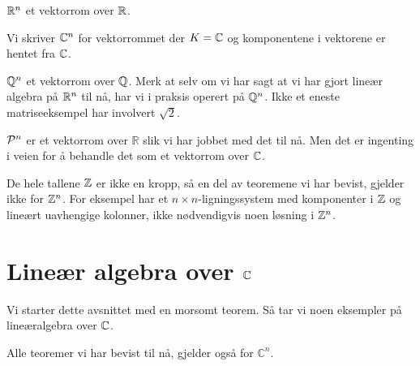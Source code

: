 \begin{ex}
$\R^n$ et vektorrom over $\R$.
\end{ex}

\begin{ex}
Vi skriver $\C^n$ for vektorrommet der $K=\C$ og komponentene i vektorene er hentet fra $\C$.
\end{ex}

\begin{ex}
$\Q^n$ et vektorrom over $\Q$. Merk at selv om vi har sagt at vi har gjort lineær algebra på $\R^n$ til nå, har vi i praksis operert på $\Q^n$. Ikke et eneste matriseeksempel har involvert $\sqrt{2}$.
\end{ex}

\begin{ex}
$\P^n$ er et vektorrom over $\mathbb R$ slik vi har jobbet med det til nå. 
Men det er ingenting i veien for å behandle det som et vektorrom over $\C$.
\end{ex}


\begin{ex}
De hele tallene $\Z$ er ikke en kropp, så en del av teoremene vi har bevist, gjelder ikke for $\Z^n$. 
For eksempel har et $n\times n$-ligningssystem med komponenter i $\Z$ og lineært uavhengige kolonner,  
ikke nødvendigvis noen løsning i $\Z^n$. 
\end{ex}



\section*{Lineær algebra over $\C$}

Vi starter dette avsnittet med en morsomt teorem. Så tar vi noen eksempler på lineæralgebra over $\C$.

\begin{thm}
Alle teoremer vi har bevist til nå, gjelder også for $\mathbb C^n$. 
\end{thm}




